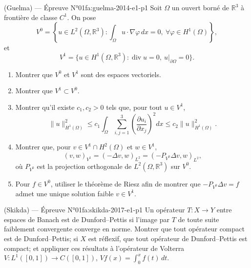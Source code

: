 \begin{problem}{(Guelma) — Épreuve N°01}{fa:guelma-2014-e1-p1}
Soit $\Omega$ un ouvert borné de $\mathbb{R}^3$ à frontière de classe $C^1$. On pose
$$V^0=\left\{u\in L^2(\Omega,\mathbb{R}^3):\int_\Omega u\cdot\nabla\varphi\,dx=0,\ \forall\varphi\in H^1(\Omega)\right\},$$
et
$$V^1=\{u\in H^1(\Omega,\mathbb{R}^3):\operatorname{div}u=0,\ u|_{\partial\Omega}=0\}.$$
\begin{enumerate}\item Montrer que $V^0$ et $V^1$ sont des espaces vectoriels.\item Montrer que $V^1\subset V^0$.\item Montrer qu'il existe $c_1,c_2>0$ tels que, pour tout $u\in V^1$,
$$\|u\|_{H^1(\Omega)}^2\le c_1\int_\Omega\sum_{i,j=1}^3\left(\frac{\partial u_i}{\partial x_j}\right)^2dx\le c_2\|u\|_{H^1(\Omega)}^2.$$
\item Montrer que, pour $v\in V^1\cap H^2(\Omega)$ et $w\in V^1$,
$$(v,w)_{V^1}=(-\Delta v,w)_{L^2}=(-P_{V^0}\Delta v,w)_{L^2},$$
où $P_{V^0}$ est la projection orthogonale de $L^2(\Omega,\mathbb{R}^3)$ sur $V^0$.\item Pour $f\in V^0$, utiliser le théorème de Riesz afin de montrer que $-P_{V^0}\Delta v=f$ admet une unique solution faible $v\in V^1$.\end{enumerate}
\end{problem}
\newpage
\begin{problem}{(Skikda) — Épreuve N°01}{fa:skikda-2017-e1-p1}
Un opérateur $T:X\to Y$ entre espaces de Banach est de Dunford--Pettis si l'image par $T$ de toute suite faiblement convergente converge en norme. Montrer que tout opérateur compact est de Dunford--Pettis; si $X$ est réflexif, que tout opérateur de Dunford--Pettis est compact; et appliquer ces résultats à l'opérateur de Volterra $V:L^1([0,1])\to C([0,1])$, $Vf(x)=\int_0^x f(t)\,dt$.
\end{problem}
\newpage

